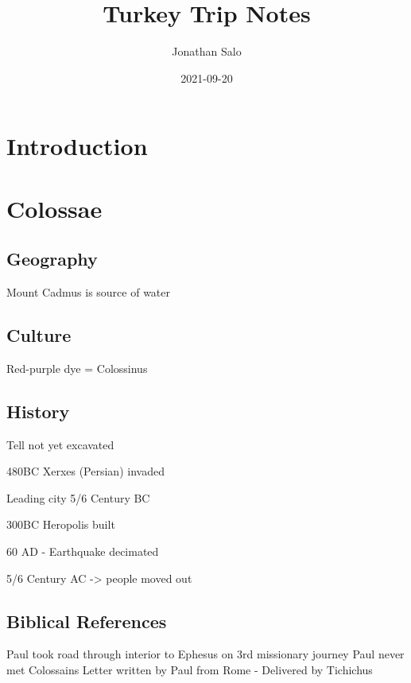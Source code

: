 \documentclass[
]{book}
\title{Turkey Trip Notes}
\author{Jonathan Salo}
\date{2021-09-20}
\begin{document}
\maketitle

{
\setcounter{tocdepth}{1}
\tableofcontents
}
\hypertarget{intro}{%
\chapter{Introduction}\label{intro}}

\hypertarget{colossae}{%
\chapter{Colossae}\label{colossae}}

\hypertarget{geography}{%
\section{Geography}\label{geography}}

Mount Cadmus is source of water

\hypertarget{culture}{%
\section{Culture}\label{culture}}

Red-purple dye = Colossinus

\hypertarget{history}{%
\section{History}\label{history}}

Tell not yet excavated

480BC Xerxes (Persian) invaded

Leading city 5/6 Century BC

300BC Heropolis built

60 AD - Earthquake decimated

5/6 Century AC -\textgreater{} people moved out

\hypertarget{biblical-references}{%
\section{Biblical References}\label{biblical-references}}

Paul took road through interior to Ephesus on 3rd missionary journey
Paul never met Colossains
Letter written by Paul from Rome - Delivered by Tichichus
\end{document}

